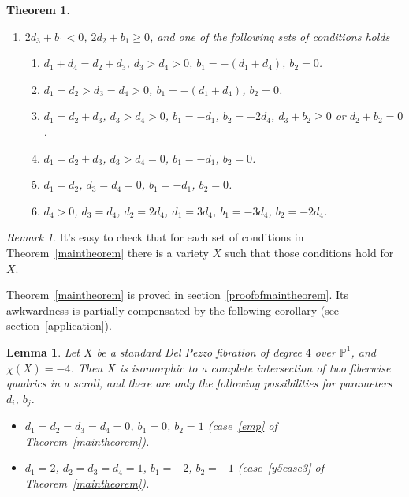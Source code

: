 \documentclass[12pt]{amsart}
\makeatletter
\newcommand{\symbitem}[1]{\item[#1]%
\renewcommand{\@currentlabel}{#1}\ignorespaces}
\newtheorem{theorem}[equation]{Theorem}
\newtheorem{lemma}[equation]{Lemma}
\theoremstyle{definition}
\theoremstyle{remark}
\newtheorem{remark}[equation]{Remark}
\makeatother
\begin{document}
\begin{theorem}
\begin{enumerate}
\item\label{y3} $2d_3+b_1<0$, $2d_2+b_1\geqslant 0$, and one of the 
following sets of conditions holds
\begin{enumerate}
\item%
\label{y3case1} $d_1+d_4=d_2+d_3$, $d_3>d_4>0$, $b_1=-(d_1+d_4)$, $b_2=0$.
\item%
\label{y3case2} $d_1=d_2>d_3=d_4>0$, $b_1=-(d_1+d_4)$, $b_2=0$.
\item%
\label{y3case3} $d_1=d_2+d_3$, $d_3>d_4>0$, $b_1=-d_1$, $b_2=-2d_4$,
$d_3+b_2\geqslant 0$ or $d_2+b_2=0$.
\item%
\label{y3case4} $d_1=d_2+d_3$, $d_3>d_4=0$, $b_1=-d_1$, $b_2=0$.
\item%
\label{y3case5} $d_1=d_2$, $d_3=d_4=0$, $b_1=-d_1$, $b_2=0$.
\item%
\label{y3case6} $d_4>0$, $d_3=d_4$, $d_2=2d_4$, $d_1=3d_4$, $b_1=-3d_4$,
$b_2=-2d_4$.
\end{enumerate}
\end{enumerate}
\end{theorem}

\begin{remark}
It's easy to check that for each set of conditions in Theorem~\ref{maintheorem}
there is a variety $X$ such that those conditions hold for $X$.
\end{remark}

Theorem~\ref{maintheorem} is proved in section~\ref{proofofmaintheorem}. 
Its awkwardness is partially compensated by the following corollary 
(see section~\ref{application}).



\begin{lemma}\label{lemma:interesting-varieties}
Let $X$ be a standard Del Pezzo fibration of degree $4$ over 
${\mathbb{P}}^1$, and $\chi(X)=-4$. Then $X$ is isomorphic to a complete 
intersection of two fiberwise quadrics in a scroll, and there are only the
following possibilities for parameters $d_i$, $b_j$.
\begin{itemize}
\item[$(X_1)$] $d_1=d_2=d_3=d_4=0$, $b_1=0$, $b_2=1$ 
(case~\ref{emp} of Theorem~\ref{maintheorem}).
\item[$(X_2)$] $d_1=2$, $d_2=d_3=d_4=1$, $b_1=-2$, $b_2=-1$
(case~\ref{y5case3} of Theorem~\ref{maintheorem}).
\end{itemize}
\end{lemma}
\end{document}
